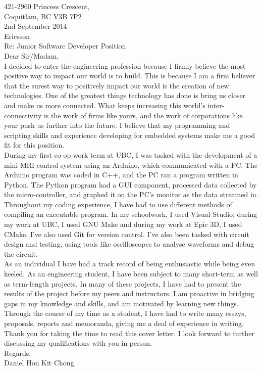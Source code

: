 \documentclass[10pt,a4paper]{article}
\begin{document}
\flushleft
\large
421-2960 Princess Crescent,\\
Coquitlam, BC V3B 7P2 \\
\medskip
2nd September 2014 \\
\medskip
Ericsson\\
\medskip
Re: Junior Software Developer Position\\
\medskip
Dear Sir/Madam,\\

\medskip
\hspace{10mm}
I decided to enter the engineering profession because I firmly believe the most positive way to impact our world is to build.
This is because I am a firm believer that the surest way to positively impact our world is the creation of new technologies.
One of the greatest things technology has done is bring us closer and make us more connected.
What keeps increasing this world's inter-connectivity is the work of firms like yours, and the work of corporations like your push us further into the future. 
I believe that my 
programming and scripting skills and
experience developing for embedded systems
make me a good fit for this position.\\
\medskip
\hspace{10mm}
During my first co-op work term at UBC, I was tasked with the development of a mini-MRI control system using an Arduino, which communicated with a PC.
The Arduino program was coded in C++, and the PC ran a program written in Python. The Python program had a GUI component, processed data collected by the 
micro-controller, and graphed it on the PC's monitor as the data streamed in.
Throughout my coding experience, I have had to use different methods of compiling an executable program. 
In my schoolwork, I used Visual Studio; during my work at UBC, I used GNU Make and during my work at Epic 3D, I used CMake.
I've also used Git for version control.
I've also been tasked with circuit design and testing, using tools like oscilloscopes to analyse waveforms and debug the circuit.
\\
\medskip
\hspace{10mm}
As an individual I have had a track record of being enthusiastic while being even keeled. 
As an engineering student, I have been subject to many short-term as well as term-length projects.
In many of these projects, I have had to present the results of the project before my peers and instructors.
I am proactive in bridging gaps in my knowledge and skills, and am motivated by learning new things.
Through the course of my time as a student, I have had to write many essays, proposals, reports and memoranda, giving me a deal of experience in writing.
Thank you for taking the time to read this cover letter.
I look forward to further discussing my qualifications with you in person.\\


\bigskip
Regards, \\
Daniel Hon Kit Chong
\end{document}
